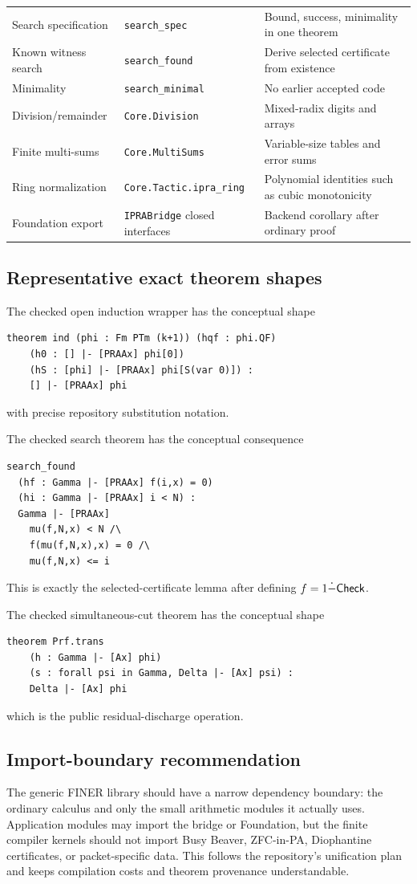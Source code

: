 \begin{longtable}{@{}p{}p{}p{}@{}}
Search specification & \texttt{search\_spec} & Bound, success, minimality in one theorem \\
Known witness search & \texttt{search\_found} & Derive selected certificate from existence \\
Minimality & \texttt{search\_minimal} & No earlier accepted code \\
Division/remainder & \texttt{Core.Division} & Mixed-radix digits and arrays \\
Finite multi-sums & \texttt{Core.MultiSums} & Variable-size tables and error sums \\
Ring normalization & \texttt{Core.Tactic.ipra\_ring} & Polynomial identities such as cubic monotonicity \\
Foundation export & \texttt{IPRABridge} closed interfaces & Backend corollary after ordinary proof \\
\bottomrule
\end{longtable}

\subsection{Representative exact theorem shapes}

The checked open induction wrapper has the conceptual shape
\begin{lstlisting}[language={}]
theorem ind (phi : Fm PTm (k+1)) (hqf : phi.QF)
    (h0 : [] |- [PRAAx] phi[0])
    (hS : [phi] |- [PRAAx] phi[S(var 0)]) :
    [] |- [PRAAx] phi
\end{lstlisting}
with precise repository substitution notation.

The checked search theorem has the conceptual consequence
\begin{lstlisting}[language={}]
search_found
  (hf : Gamma |- [PRAAx] f(i,x) = 0)
  (hi : Gamma |- [PRAAx] i < N) :
  Gamma |- [PRAAx]
    mu(f,N,x) < N /\
    f(mu(f,N,x),x) = 0 /\
    mu(f,N,x) <= i
\end{lstlisting}
This is exactly the selected-certificate lemma after defining \(f=1\dot{-}\mathsf{Check}\).

The checked simultaneous-cut theorem has the conceptual shape
\begin{lstlisting}[language={}]
theorem Prf.trans
    (h : Gamma |- [Ax] phi)
    (s : forall psi in Gamma, Delta |- [Ax] psi) :
    Delta |- [Ax] phi
\end{lstlisting}
which is the public residual-discharge operation.

\subsection{Import-boundary recommendation}

The generic FINER library should have a narrow dependency boundary: the ordinary calculus and only the small arithmetic modules it actually uses.  Application modules may import the bridge or Foundation, but the finite compiler kernels should not import Busy Beaver, ZFC-in-PA, Diophantine certificates, or packet-specific data.  This follows the repository's unification plan and keeps compilation costs and theorem provenance understandable.
